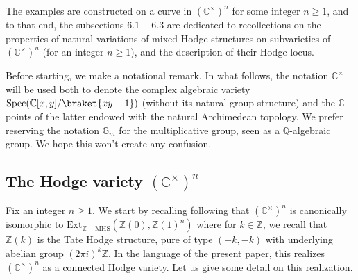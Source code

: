\documentclass[10pt]{article}
\numberwithin{equation}{subsection}
\theoremstyle{plain}
\theoremstyle{definition}
\newtheorem{definition}[theorem]{Definition}
\theoremstyle{remark}
\newcommand{\Z}{\mathbb Z}
\newcommand{\Q}{\mathbb Q}
\newcommand{\C}{\mathbb C}
\newcommand{\V}{\mathbb V}
\newcommand{\mult}{\mathbb G}
\newcommand{\pp}{\mathbf P}
\newcommand{\M}{\mathbf M}
\newcommand{\NN}{\mathbf N}
\newcommand{\Np}{\mathcal{N}(\pp)}
\begin{document}
The examples are constructed on a curve in $(\C^\times)^n$ for some integer $n \geqslant 1$, and to that end, the subsections $6.1-6.3$ are dedicated to recollections on the properties of natural variations of mixed Hodge structures on subvarieties of $(\C^\times)^n$ (for an integer $n \geqslant 1$), and the description of their Hodge locus.

Before starting, we make a notational remark. In what follows, the notation $\C^\times$ will be used both to denote the complex algebraic variety $\mathrm{Spec}(\C[x,y]/\braket{xy-1})$ (without its natural group structure) and the $\C$-points of the latter endowed with the natural Archimedean topology. We prefer reserving the notation $\mult_m$ for the multiplicative group, seen as a $\Q$-algebraic group. We hope this won't create any confusion.
\subsection{The Hodge variety $(\C^\times)^n$}
Fix an integer $n \geqslant 1$. We start by recalling following \cite{carlext} that $(\C^\times)^n$ is canonically isomorphic to $\mathrm{Ext}_{\Z-\mathrm{MHS}}(\Z(0), \Z(1)^n)$ where for $k \in \Z$, we recall that $\Z(k)$ is the Tate Hodge structure, pure of type $(-k,-k)$ with underlying abelian group $(2\pi i)^k \Z$. In the language of the present paper, this realizes $(\C^\times)^n$ as a connected Hodge variety. Let us give some detail on this realization.
\end{document}
